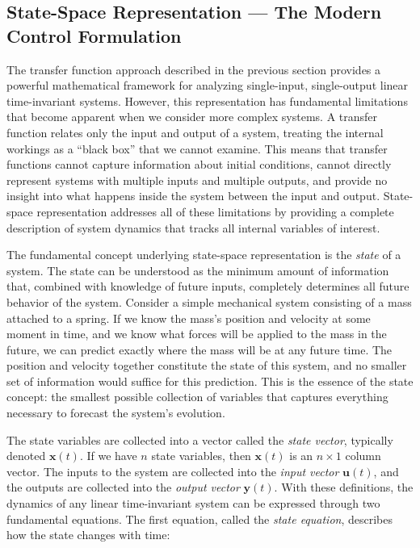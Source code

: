 \subsection{State-Space Representation --- The Modern Control Formulation}

The transfer function approach described in the previous section provides a powerful mathematical framework for analyzing single-input, single-output linear time-invariant systems. However, this representation has fundamental limitations that become apparent when we consider more complex systems. A transfer function relates only the input and output of a system, treating the internal workings as a ``black box'' that we cannot examine. This means that transfer functions cannot capture information about initial conditions, cannot directly represent systems with multiple inputs and multiple outputs, and provide no insight into what happens inside the system between the input and output. State-space representation addresses all of these limitations by providing a complete description of system dynamics that tracks all internal variables of interest.

The fundamental concept underlying state-space representation is the \emph{state} of a system. The state can be understood as the minimum amount of information that, combined with knowledge of future inputs, completely determines all future behavior of the system. Consider a simple mechanical system consisting of a mass attached to a spring. If we know the mass's position and velocity at some moment in time, and we know what forces will be applied to the mass in the future, we can predict exactly where the mass will be at any future time. The position and velocity together constitute the state of this system, and no smaller set of information would suffice for this prediction. This is the essence of the state concept: the smallest possible collection of variables that captures everything necessary to forecast the system's evolution.

The state variables are collected into a vector called the \emph{state vector}, typically denoted $\mathbf{x}(t)$. If we have $n$ state variables, then $\mathbf{x}(t)$ is an $n \times 1$ column vector. The inputs to the system are collected into the \emph{input vector} $\mathbf{u}(t)$, and the outputs are collected into the \emph{output vector} $\mathbf{y}(t)$. With these definitions, the dynamics of any linear time-invariant system can be expressed through two fundamental equations. The first equation, called the \emph{state equation}, describes how the state changes with time:

